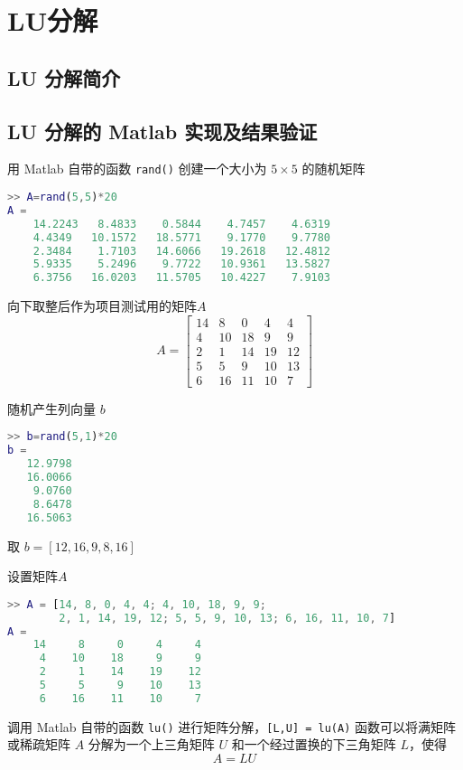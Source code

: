 \chapter{LU分解}
\section{LU 分解简介}
\section{LU 分解的 Matlab 实现及结果验证}
用 Matlab 自带的函数 \lstinline|rand()| 创建一个大小为 $5\times 5$ 的随机矩阵


\begin{lstlisting}[language=Matlab]  
>> A=rand(5,5)*20
A =
    14.2243   8.4833    0.5844    4.7457    4.6319
    4.4349   10.1572   18.5771    9.1770    9.7780
    2.3484    1.7103   14.6066   19.2618   12.4812
    5.9335    5.2496    9.7722   10.9361   13.5827
    6.3756   16.0203   11.5705   10.4227    7.9103
\end{lstlisting}


向下取整后作为项目测试用的矩阵$A$
\begin{equation}
    A=\begin{bmatrix}
        14 & 8  & 0  & 4  & 4  \\
        4  & 10 & 18 & 9  & 9  \\
        2  & 1  & 14 & 19 & 12 \\
        5  & 5  & 9  & 10 & 13 \\
        6  & 16 & 11 & 10 & 7
    \end{bmatrix}
\end{equation}

随机产生列向量 $b$
\begin{lstlisting}[language=Matlab]  
>> b=rand(5,1)*20
b =
   12.9798
   16.0066
    9.0760
    8.6478
   16.5063
\end{lstlisting}

取 $b=[12,16,9,8,16]$

设置矩阵$A$
\begin{lstlisting}[language=Matlab]  
>> A = [14, 8, 0, 4, 4; 4, 10, 18, 9, 9;
        2, 1, 14, 19, 12; 5, 5, 9, 10, 13; 6, 16, 11, 10, 7]
A =
    14     8     0     4     4
     4    10    18     9     9
     2     1    14    19    12
     5     5     9    10    13
     6    16    11    10     7
\end{lstlisting}

调用 Matlab 自带的函数 \lstinline|lu()| 进行矩阵分解，\lstinline|[L,U] = lu(A)| 函数可以将满矩阵或稀疏矩阵 $A$ 分解为一个上三角矩阵 $U$ 和一个经过置换的下三角矩阵 $L$，使得
\begin{equation}
    A = LU
\end{equation}

